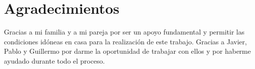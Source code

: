 

\chapter{Agradecimientos}

Gracias a mi familia y a mi pareja por ser un apoyo fundamental y permitir las condiciones idóneas en casa para la realización de este trabajo. Gracias a Javier, Pablo y Guillermo por darme la oportunidad de trabajar con ellos y por haberme ayudado durante todo el proceso.

\cleardoublepage
\endinput
